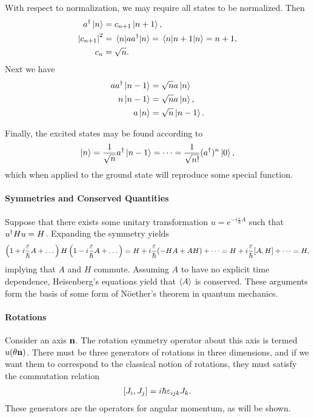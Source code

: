 With respect to normalization, we may require all states to be normalized. Then
\begin{align*}
	a^{\dagger}\ket{n}      &= c_{n + 1}\ket{n + 1}, \\
	\abs{c_{n + 1}}^{2} &= \expval{aa^{\dagger}}{n} = \expval{n + 1}{n} = n + 1, \\
	c_{n}               &= \sqrt{n}.
\end{align*}
Next we have
\begin{align*}
	aa^{\dagger}\ket{n - 1} &= \sqrt{n}a\ket{n} \\
	n\ket{n - 1}        &= \sqrt{n}a\ket{n}, \\
	a\ket{n}            &= \sqrt{n}\ket{n - 1}.
\end{align*}

Finally, the excited states may be found according to
\begin{align*}
	\ket{n} = \frac{1}{\sqrt{n}}a^{\dagger}\ket{n - 1} = \dots = \frac{1}{\sqrt{n!}}(a^{\dagger})^{n}\ket{0},
\end{align*}
which when applied to the ground state will reproduce some special function.

\paragraph{Symmetries and Conserved Quantities}
Suppose that there exists some unitary transformation $u = e^{-i\frac{\varepsilon}{\hbar}A}$ such that $u^{\dagger}Hu = H$. Expanding the symmetry yields
\begin{align*}
	\left(1 + i\frac{\varepsilon}{\hbar}A + \dots\right)H\left(1 - i\frac{\varepsilon}{\hbar}A + \dots\right) = H + i\frac{\varepsilon}{\hbar}(-HA + AH) + \dots = H + i\frac{\varepsilon}{\hbar}\comm{A}{H} + \dots = H,
\end{align*}
implying that $A$ and $H$ commute. Assuming $A$ to have no explicit time dependence, Heisenberg's equations yield that $\expval{A}$ is conserved. These arguments form the basis of some form of Nöether's theorem in quantum mechanics.

\paragraph{Rotations}
Consider an axis $\vb{n}$. The rotation symmetry operator about this axis is termed $u(\theta\vb{n})$. There must be three generators of rotations in three dimensions, and if we want them to correspond to the classical notion of rotations, they must satisfy the commutation relation
\begin{align*}
	\comm{J_{i}}{J_{j}} = i\hbar\varepsilon_{ijk}J_{k}.
\end{align*}
These generators are the operators for angular momentum, as will be shown.

